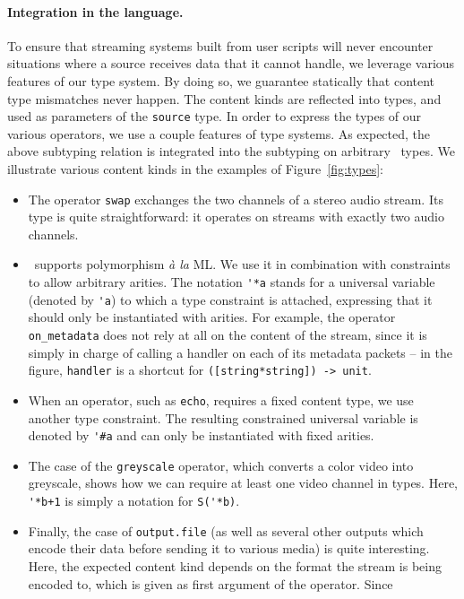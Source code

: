 \paragraph{Integration in the language.}
To ensure that streaming systems built from user scripts will never
encounter situations where a source receives data that it cannot handle,
we leverage various features of our type system.
By doing so, we guarantee statically that content type mismatches never happen.
The content kinds are reflected into types,
and used as parameters of the \texttt{source} type.
In order to express the types of our various operators,
we use a couple features of type systems.
As expected, the above subtyping relation is integrated into
the subtyping on arbitrary \liquidsoap\ types.
We illustrate various content kinds in the examples of Figure~\ref{fig:types}:
\begin{itemize}
\item The operator \texttt{swap} exchanges the two channels of a stereo audio
  stream. Its type is quite straightforward: it operates on streams with exactly
  two audio channels.
\item
  \liquidsoap\ supports polymorphism \emph{à la} ML.
  We use it in combination with constraints to allow arbitrary arities.
  The notation \verb.'*a. stands for a universal variable (denoted
  by \verb.'a.) to which a type constraint is attached, expressing that
  it should only be instantiated with arities.
  For example, the operator \verb.on_metadata. does not rely
  at all on the content of the stream, since it is simply in
  charge of calling a handler on each of its metadata packets --
  in the figure, \verb.handler. is a shortcut for
  \verb.([string*string]) -> unit..
\item When an operator, such as \verb.echo., requires a fixed content type, we
  use another type constraint. The resulting constrained universal
  variable is denoted by \verb.'#a. and can only be instantiated with
  fixed arities.
\item The case of the \texttt{greyscale} operator, which converts a color
  video into greyscale, shows how we can require at least one video channel in
  types.  Here, \verb.'*b+1. is simply a notation for \verb.S('*b)..
\item Finally, the case of \verb#output.file# (as well as several other outputs
  which encode their data before sending it to various media) is quite
  interesting. Here, the expected content kind depends on the format the stream
  is being encoded to, which is given as first argument of the operator. Since

\end{itemize}
